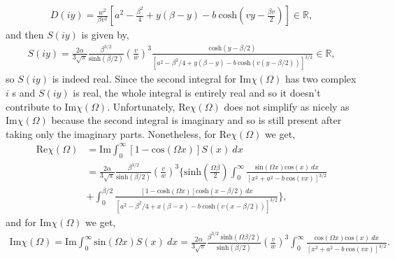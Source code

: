 \begin{equation}
    \begin{gathered}
        D(iy) = \frac{w^2}{\beta v^2} \left[a^2 - \frac{\beta^2}{4} + y(\beta - y) - b\ \textrm{cosh}\left( vy - \frac{\beta v}{2} \right) \right] \in \mathbb{R},
    \end{gathered}
\end{equation}
and then $S(iy)$ is given by, 
\begin{equation}
    \begin{gathered}
        S(iy) = \frac{2 \alpha}{3 \sqrt{\pi}} \frac{\beta^{3/2}}{\textrm{sinh}(\beta / 2)} \left( \frac{v}{w} \right)^3 \frac{\textrm{cosh}(y - \beta / 2)}{\left[a^2 - \beta^2/4 + y(\beta - y) - b\ \textrm{cosh}(v(y - \beta / 2)) \right]^{3/2}} \in \mathbb{R},
    \end{gathered}
\end{equation}
so $S(iy)$ is indeed real. Since the second integral for $\textrm{Im}\chi(\Omega)$ has two complex $i$ s and $S(iy)$ is real, the whole integral is entirely real and so it doesn't contribute to $\textrm{Im}\chi(\Omega)$. Unfortunately, $\textrm{Re}\chi(\Omega)$ does not simplify as nicely as $\textrm{Im}\chi(\Omega)$ because the second integral is imaginary and so is still present after taking only the imaginary parts. Nonetheless, for $\textrm{Re}\chi(\Omega)$ we get,
\begin{equation}
    \begin{aligned}
        \textrm{Re}\chi(\Omega) &= \textrm{Im} \int_0^\infty \left[1 - \textrm{cos}(\Omega x)\right] S(x)\ dx \\
        &=\frac{2 \alpha}{3 \sqrt{\pi}} \frac{\beta^{3/2}}{\textrm{sinh}(\beta / 2)} \left( \frac{v}{w} \right)^3 \bigg\{
        \textrm{sinh}\left( \frac{\Omega \beta}{2} \right) \int_0^\infty \frac{\textrm{sin}(\Omega x) \textrm{cos}(x)\ dx}{\left[ x^2 + a^2 - b\ \textrm{cos}(vx) \right]^{3/2}}\\
        &+ \int_0^{\beta/2} \frac{\left[ 1 - \textrm{cosh}(\Omega x) \right] \textrm{cosh}(x - \beta / 2)\ dx }{\left[ a^2 - \beta^2 / 4 + x(\beta - x) - b\ \textrm{cosh}(v(x - \beta / 2)) \right]^{3/2}} \bigg\},
    \end{aligned}
\end{equation}
and for $\textrm{Im}\chi(\Omega)$ we get,
\begin{equation} \label{eqn: ImX}
    \begin{aligned}
         \textrm{Im}\chi(\Omega) = \textrm{Im} \int_0^\infty \textrm{sin}(\Omega x) S(x)\ dx
         = \frac{2 \alpha}{3 \sqrt{\pi}} \frac{\beta^{3/2}\ \textrm{sinh}(\Omega \beta / 2)}{\textrm{sinh}(\beta / 2)} \left( \frac{v}{w} \right)^3 \int_0^\infty \frac{\textrm{cos}(\Omega x) \textrm{cos}(x)\ dx}{\left[x^2 + a^2 - b\ \textrm{cos}(vx) \right]^{3/2}}.
    \end{aligned}
\end{equation}

